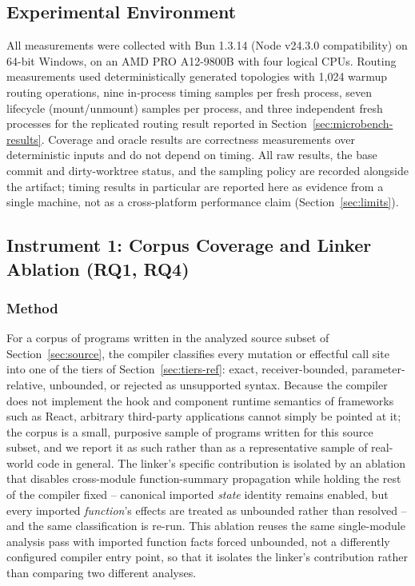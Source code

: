 \documentclass[conference]{IEEEtran}
\begin{document}
\subsection{Experimental Environment}
\label{sec:env}

All measurements were collected with Bun 1.3.14 (Node v24.3.0
compatibility) on 64-bit Windows, on an AMD PRO A12-9800B with four logical
CPUs. Routing measurements used deterministically generated topologies with
1{,}024 warmup routing operations, nine in-process timing samples per fresh
process, seven lifecycle (mount/unmount) samples per process, and three
independent fresh processes for the replicated routing result reported in
Section~\ref{sec:microbench-results}. Coverage and oracle results are
correctness measurements over deterministic inputs and do not depend on
timing. All raw results, the base commit and dirty-worktree status, and the
sampling policy are
recorded alongside the artifact; timing results in particular are reported
here as evidence from a single machine, not as a cross-platform performance
claim (Section~\ref{sec:limits}).

\subsection{Instrument 1: Corpus Coverage and Linker Ablation (RQ1, RQ4)}
\label{sec:corpus}

\subsubsection{Method}
For a corpus of programs written in the analyzed source subset of
Section~\ref{sec:source}, the compiler classifies every mutation or effectful
call site into one of the tiers of Section~\ref{sec:tiers-ref}:
exact, receiver-bounded, parameter-relative, unbounded, or rejected as
unsupported syntax. Because the compiler does not implement the hook and
component runtime semantics of frameworks such as React, arbitrary
third-party applications cannot simply be pointed at it; the corpus is a
small, purposive sample of programs written for this source subset, and we
report it as such rather than as a representative sample of real-world code
in general. The linker's specific contribution is isolated by an ablation
that disables cross-module function-summary propagation while holding the
rest of the compiler fixed -- canonical imported \emph{state} identity
remains enabled, but every imported \emph{function}'s effects are treated as
unbounded rather than resolved -- and the same classification is re-run.
This ablation reuses the same single-module analysis pass with imported
function facts forced unbounded, not a differently configured compiler entry
point, so that it isolates the linker's contribution rather than comparing
two different analyses.
\end{document}
